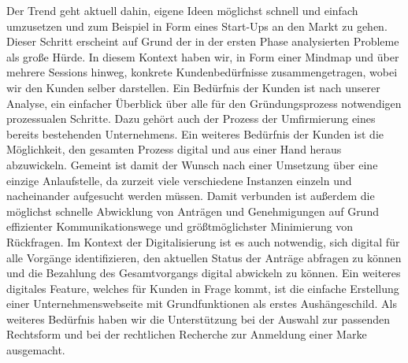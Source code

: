 Der Trend geht aktuell dahin, eigene Ideen möglichst schnell und einfach umzusetzen und zum Beispiel in Form eines Start-Ups an den Markt zu gehen. Dieser Schritt erscheint auf Grund der in der ersten Phase analysierten Probleme als große Hürde. In diesem Kontext haben wir, in Form einer Mindmap und über mehrere Sessions hinweg, konkrete Kundenbedürfnisse zusammengetragen, wobei wir den Kunden selber darstellen.
Ein Bedürfnis der Kunden ist nach unserer Analyse, ein einfacher Überblick über alle für den Gründungsprozess notwendigen prozessualen Schritte. Dazu gehört auch der Prozess der Umfirmierung eines bereits bestehenden Unternehmens.
Ein weiteres Bedürfnis der Kunden ist die Möglichkeit, den gesamten Prozess digital und aus einer Hand heraus abzuwickeln. Gemeint ist damit der Wunsch nach einer Umsetzung über eine einzige Anlaufstelle, da zurzeit viele verschiedene Instanzen einzeln und nacheinander aufgesucht werden müssen. Damit verbunden ist außerdem die möglichst schnelle Abwicklung von Anträgen und Genehmigungen auf Grund effizienter Kommunikationswege und größtmöglichster Minimierung von Rückfragen.
Im Kontext der Digitalisierung ist es auch notwendig, sich digital für alle Vorgänge identifizieren, den aktuellen Status der Anträge abfragen zu können und die Bezahlung des Gesamtvorgangs digital abwickeln zu können. Ein weiteres digitales Feature, welches für Kunden in Frage kommt, ist die einfache Erstellung einer Unternehmenswebseite mit Grundfunktionen als erstes Aushängeschild.
Als weiteres Bedürfnis haben wir die Unterstützung bei der Auswahl zur passenden Rechtsform und bei der rechtlichen Recherche zur Anmeldung einer Marke ausgemacht.
